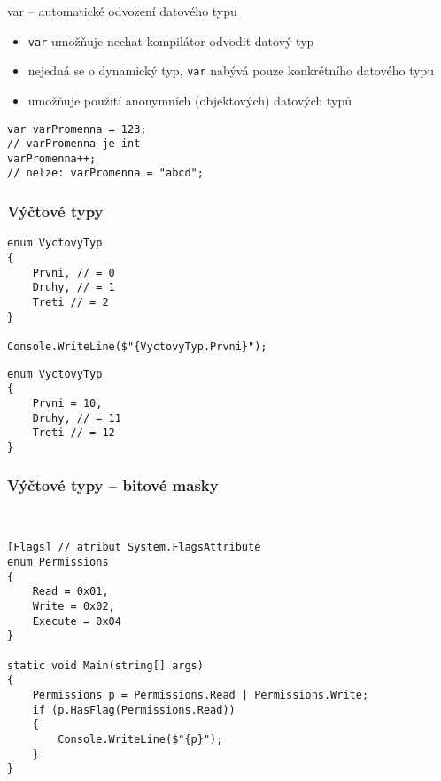\begin{frame}[fragile]
\begin{block}{var -- automatické odvození datového typu}
\begin{itemize}
\item \lstinline|var| umožňuje nechat kompilátor odvodit datový typ
\item nejedná se o dynamický typ, \lstinline|var| nabývá pouze konkrétního datového typu
\item umožňuje použití anonymních (objektových) datových typů 
\end{itemize}
\end{block}
\begin{yesblock}
\begin{lstlisting}
var varPromenna = 123;
// varPromenna je int
varPromenna++;
// nelze: varPromenna = "abcd";
\end{lstlisting}
\end{yesblock}
\end{frame}


\begin{frame}[fragile]
\frametitle{Výčtové typy}
\begin{yesblock}
\begin{lstlisting}
enum VyctovyTyp
{
    Prvni, // = 0
    Druhy, // = 1
    Treti // = 2
}

Console.WriteLine($"{VyctovyTyp.Prvni}");
\end{lstlisting}
\end{yesblock}

\begin{yesblock}
\begin{lstlisting}
enum VyctovyTyp
{
    Prvni = 10,
    Druhy, // = 11
    Treti // = 12
}
\end{lstlisting}
\end{yesblock}
\end{frame}


\begin{frame}[fragile]
\frametitle{Výčtové typy -- bitové masky}
\begin{bonusblock}{~}
\begin{lstlisting}
[Flags] // atribut System.FlagsAttribute
enum Permissions
{
    Read = 0x01,
    Write = 0x02,
    Execute = 0x04
}

static void Main(string[] args)
{
    Permissions p = Permissions.Read | Permissions.Write;
    if (p.HasFlag(Permissions.Read))
    {
        Console.WriteLine($"{p}");
    }
}
\end{lstlisting}
\end{bonusblock}
\end{frame}



